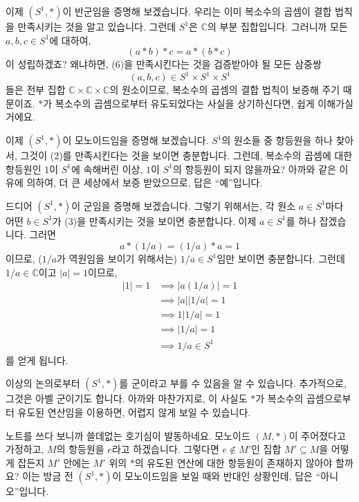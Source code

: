 \documentclass[12pt]{paper}
\begin{document}
  이제 $\left( S^1 , * \right)$이 반군임을 증명해 보겠습니다.
  우리는 이미 복소수의 곱셈이 결합 법칙을 만족시키는 것을 알고 있습니다.
  그런데 $S^1$은 $\mathbb{C}$의 부분 집합입니다.
  그러니까 모든 $a , b , c \in S^1$에 대하여, 
  \begin{equation*}
    (a * b) * c = a * (b * c) \tag{6}
  \end{equation*}
  이 성립하겠죠?
  왜냐하면, (6)을 만족시킨다는 것을 검증받아야 될 모든 삼중쌍 $$ \left( a , b , c \right) \in S^1 \times S^1 \times S^1 $$들은
  전부 집합 $\mathbb{C} \times \mathbb{C} \times \mathbb{C}$의 원소이므로,
  복소수의 곱셈의 결합 법칙이 보증해 주기 때문이죠.
  $*$가 복소수의 곱셈으로부터 유도되었다는 사실을 상기하신다면,
  쉽게 이해가실 거에요.

  이제 $\left( S^1 , * \right)$이 모노이드임을 증명해 보겠습니다.
  $S^1$의 원소들 중 항등원을 하나 찾아서, 그것이 (2)를 만족시킨다는 것을 보이면 충분합니다.
  그런데, 복소수의 곱셈에 대한 항등원인 $1$이 $S^1$에 속해버린 이상, $1$이 $S^1$의 항등원이 되지 않을까요?
  아까와 같은 이유에 의하여, 더 큰 세상에서 보증 받았으므로, 답은 ``예''입니다.

  드디어 $\left( S^1 , * \right)$이 군임을 증명해 보겠습니다.
  그렇기 위해서는, 각 원소 $a \in S^1$마다 어떤 $b \in S^1$가 (3)을 만족시키는 것을 보이면 충분합니다.
  이제 $a \in S^1$를 하나 잡겠습니다.
  그러면 $$ a * \left( 1 / a \right) = \left( 1 / a \right) * a = 1 $$이므로,
  ($1 / a$가 역원임을 보이기 위해서는) $1 / a \in S^1$임만 보이면 충분합니다.
  그런데 $1 / a \in \mathbb{C}$이고 $\left| a \right| = 1$이므로,
  \begin{align*}
    \left| 1 \right| = 1 
    & \implies \left| a \left( 1 / a \right) \right| = 1 \\
    & \implies \left| a \right| \left| 1 / a \right| = 1 \\
    & \implies 1 \left| 1 / a \right| = 1 \\
    & \implies \left| 1 / a \right| = 1 \\
    & \implies 1 / a \in S^1
  \end{align*}
  를 얻게 됩니다.

  이상의 논의로부터 $\left( S^1 , * \right)$를 군이라고 부를 수 있음을 알 수 있습니다.
  추가적으로, 그것은 아벨 군이기도 합니다.
  아까와 마찬가지로, 이 사실도 $*$가 복소수의 곱셈으로부터 유도된 연산임을 이용하면,
  어렵지 않게 보일 수 있습니다.

  노트를 쓰다 보니까 쓸데없는 호기심이 발동하네요.
  모노이드 $\left( M , * \right)$이 주어졌다고 가정하고, $M$의 항등원을 $e$라고 하겠습니다.
  그렇다면 $e \notin M'$인 집합 $M' \subseteq M$을 어떻게 잡든지 $M'$ 안에는 $M'$ 위의 $*$의 유도된 연산에 대한 항등원이 존재하지 않아야 할까요?
  이는 방금 전 $\left( S^1 , * \right)$이 모노이드임을 보일 때와 반대인 상황인데, 답은 ``아니오''입니다.
\end{document}
